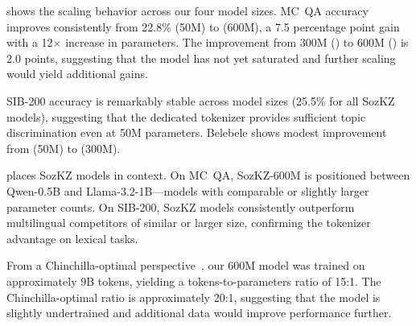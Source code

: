  shows the scaling behavior across our four model sizes.
MC~QA accuracy improves consistently from 22.8\% (50M) to \accMcQaSozKZSixHundredM{} (600M), a 7.5 percentage point gain with a 12$\times$ increase in parameters.
The improvement from 300M (\accMcQaSozKZThreeHundredM{}) to 600M (\accMcQaSozKZSixHundredM{}) is 2.0 points, suggesting that the model has not yet saturated and further scaling would yield additional gains.

SIB-200 accuracy is remarkably stable across model sizes (25.5\% for all SozKZ models), suggesting that the dedicated tokenizer provides sufficient topic discrimination even at 50M parameters.
Belebele shows modest improvement from \accBelebeleSozKZFiftyM{} (50M) to \accBelebeleSozKZThreeHundredM{} (300M).

 places SozKZ models in context.
On MC~QA, SozKZ-600M is positioned between Qwen-0.5B and Llama-3.2-1B---models with comparable or slightly larger parameter counts.
On SIB-200, SozKZ models consistently outperform multilingual competitors of similar or larger size, confirming the tokenizer advantage on lexical tasks.

From a Chinchilla-optimal perspective~\citep{hoffmann2022chinchilla}, our 600M model was trained on approximately 9B tokens, yielding a tokens-to-parameters ratio of 15:1.
The Chinchilla-optimal ratio is approximately 20:1, suggesting that the model is slightly undertrained and additional data would improve performance further.
